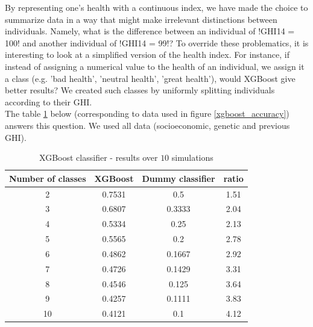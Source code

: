 \documentclass[]{article}
\begin{document}
\noindent
By representing one's health with a continuous index, we have made the choice to summarize data in a way that might make irrelevant distinctions between individuals. Namely, what is the difference between an individual of \pyth!GHI14 = 100! and another individual of \pyth!GHI14 = 99!? To override these problematics, it is interesting to look at a simplified version of the health index. For instance, if instead of assigning a numerical value to the health of an individual, we assign it a class (e.g. 'bad health', 'neutral health', 'great health'), would XGBoost give better results? We created such classes by uniformly splitting individuals according to their GHI.\\
The table \ref{results_xgbclassifier} below (corresponding to data used in figure \ref{xgboost_accuracy}) answers this question. We used all data (socioeconomic, genetic and previous GHI).
\begin{table}[!h]
	\centering
	\begin{tabular}{|c|c|c|c|}
		\hline
		
		\textbf{Number of classes} & \textbf{XGBoost} & \textbf{Dummy classifier} & \textbf{ratio}\\
		\hline
		2 & 0.7531 & 0.5 & 1.51\\
		\hline 
		3 & 0.6807 & 0.3333 & 2.04\\
		\hline 
		4 & 0.5334 & 0.25 & 2.13\\
		\hline 
		5 & 0.5565 & 0.2 & 2.78\\
		\hline 
		6 & 0.4862 & 0.1667 & 2.92\\
		\hline 
		7 & 0.4726 & 0.1429 & 3.31\\
		\hline 
		8 & 0.4546 & 0.125 & 3.64\\
		\hline 
		9 & 0.4257 & 0.1111 & 3.83\\
		\hline 
		10 & 0.4121 & 0.1 & 4.12\\
		\hline 
	\end{tabular}
	\caption{XGBoost classifier - results over $10$ simulations}
	\label{results_xgbclassifier}
\end{table}\\
\end{document}
